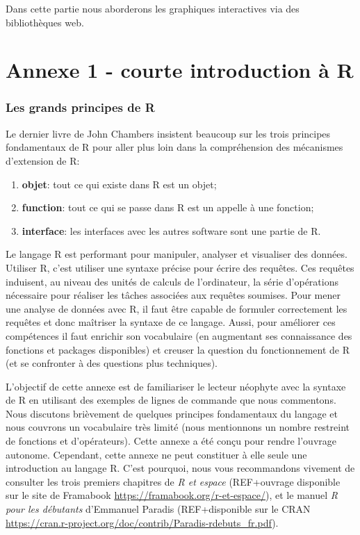 \documentclass[]{article}
\providecommand{\tightlist}{%
  \setlength{\itemsep}{0pt}\setlength{\parskip}{0pt}}
\begin{document}
Dans cette partie nous aborderons les graphiques interactives via des bibliothèques web.

\hypertarget{annexe-1---courte-introduction-uxe0-r}{%
\section*{Annexe 1 - courte introduction à R}\label{annexe-1---courte-introduction-uxe0-r}}

\hypertarget{les-grands-principes-de-r}{%
\subsubsection{Les grands principes de R}\label{les-grands-principes-de-r}}

Le dernier livre de John Chambers \citep{chambers_extending_2016} insistent beaucoup
sur les trois principes fondamentaux de R pour aller plus loin dans
la compréhension des mécanismes d'extension de R:

\begin{enumerate}
\def\labelenumi{\arabic{enumi}.}
\tightlist
\item
  \textbf{objet}: tout ce qui existe dans R est un objet;
\item
  \textbf{function}: tout ce qui se passe dans R est un appelle à une fonction;
\item
  \textbf{interface}: les interfaces avec les autres software sont une partie de R.
\end{enumerate}

Le langage R est performant pour manipuler, analyser et visualiser des données.
Utiliser R, c'est utiliser une syntaxe précise pour écrire des requêtes. Ces
requêtes induisent, au niveau des unités de calculs de l'ordinateur, la série
d'opérations nécessaire pour réaliser les tâches associées aux requêtes soumises.
Pour mener une analyse de données avec R, il faut être capable de formuler
correctement les requêtes et donc maîtriser la syntaxe de ce langage. Aussi,
pour améliorer ces compétences il faut enrichir son vocabulaire (en augmentant
ses connaissance des fonctions et packages disponibles) et creuser la question
du fonctionnement de R (et se confronter à des questions plus techniques).

L'objectif de cette annexe est de familiariser le lecteur néophyte avec
la syntaxe de R en utilisant des exemples de lignes de commande que nous
commentons. Nous discutons brièvement de quelques principes fondamentaux
du langage et nous couvrons un vocabulaire très limité (nous mentionnons un
nombre restreint de fonctions et d'opérateurs). Cette annexe a été conçu pour
rendre l'ouvrage autonome. Cependant, cette annexe ne peut constituer à elle
seule une introduction au langage R. C'est pourquoi, nous vous recommandons
vivement de consulter les trois premiers chapitres de \emph{R et espace}
(REF+ouvrage disponible sur le site de Framabook \url{https://framabook.org/r-et-espace/}),
et le manuel \emph{R pour les débutants} d'Emmanuel Paradis (REF+disponible sur le CRAN \url{https://cran.r-project.org/doc/contrib/Paradis-rdebuts_fr.pdf}).
\end{document}
